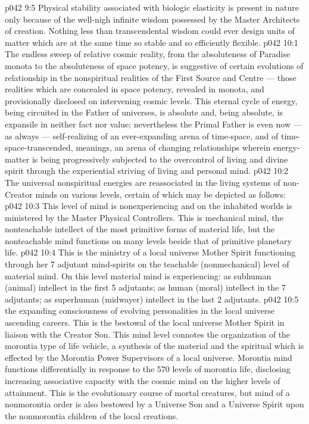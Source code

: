 \vs p042 9:5 Physical stability associated with biologic elasticity is present in nature only because of the well\hyp{}nigh infinite wisdom possessed by the Master Architects of creation. Nothing less than transcendental wisdom could ever design units of matter which are at the same time so stable and so efficiently flexible.
\vs p042 10:1 The endless sweep of relative cosmic reality, from the absoluteness of Paradise monota to the absoluteness of space potency, is suggestive of certain evolutions of relationship in the nonspiritual realities of the First Source and Centre --- those realities which are concealed in space potency, revealed in monota, and provisionally disclosed on intervening cosmic levels. This eternal cycle of energy, being circuited in the Father of universes, is absolute and, being absolute, is expansile in neither fact nor value; nevertheless the Primal Father is even now --- as always --- self\hyp{}realizing of an ever\hyp{}expanding arena of time\hyp{}space, and of time\hyp{}space\hyp{}transcended, meanings, an arena of changing relationships wherein energy\hyp{}matter is being progressively subjected to the overcontrol of living and divine spirit through the experiential striving of living and personal mind.
\vs p042 10:2 The universal nonspiritual energies are reassociated in the living systems of non\hyp{}Creator minds on various levels, certain of which may be depicted as follows:
\vs p042 10:3 \bibnobreakspace {} This level of mind is nonexperiencing and on the inhabited worlds is ministered by the Master Physical Controllers. This is mechanical mind, the nonteachable intellect of the most primitive forms of material life, but the nonteachable mind functions on many levels beside that of primitive planetary life.
\vs p042 10:4 \bibnobreakspace {} This is the ministry of a local universe Mother Spirit functioning through her 7 adjutant mind\hyp{}spirits on the teachable (nonmechanical) level of material mind. On this level material mind is experiencing: as subhuman (animal) intellect in the first 5 adjutants; as human (moral) intellect in the 7 adjutants; as superhuman (midwayer) intellect in the last 2 adjutants.
\vs p042 10:5 \bibnobreakspace {} the expanding consciousness of evolving personalities in the local universe ascending careers. This is the bestowal of the local universe Mother Spirit in liaison with the Creator Son. This mind level connotes the organization of the morontia type of life vehicle, a synthesis of the material and the spiritual which is effected by the Morontia Power Supervisors of a local universe. Morontia mind functions differentially in response to the 570 levels of morontia life, disclosing increasing associative capacity with the cosmic mind on the higher levels of attainment. This is the evolutionary course of mortal creatures, but mind of a nonmorontia order is also bestowed by a Universe Son and a Universe Spirit upon the nonmorontia children of the local creations.
